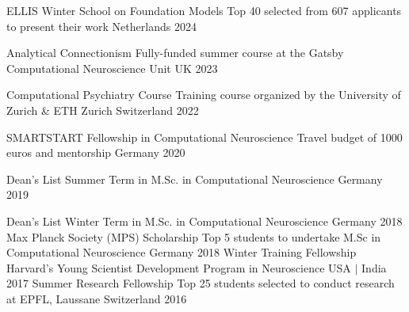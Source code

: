 



\begin{cvhonors}

    \cvhonor
    {ELLIS Winter School on Foundation Models} %
    {Top 40 selected from 607 applicants to present their work} %
    {Netherlands} %
    {2024} %
    
    \cvhonor
    {Analytical Connectionism} %
    {Fully-funded summer course at the Gatsby Computational Neuroscience Unit} %
    {UK} %
    {2023} %

    \cvhonor
    {Computational Psychiatry Course} %
    {Training course organized by the University of Zurich \& ETH Zurich} %
    {Switzerland} %
    {2022} %
    
    \cvhonor
    {SMARTSTART Fellowship in Computational Neuroscience} %
    {Travel budget of 1000 euros and mentorship} %
    {Germany} %
    {2020} %
    
  \cvhonor
    {Dean's List} %
    {Summer Term in M.Sc. in Computational Neuroscience} %
    {Germany} %
    {2019} %

  \cvhonor
    {Dean's List} %
    {Winter Term in M.Sc. in Computational Neuroscience} %
    {Germany} %
    {2018} %
    \cvhonor
    {Max Planck Society (MPS) Scholarship} %
    {Top 5 students to undertake M.Sc in Computational Neuroscience} %
    {Germany} %
    {2018} %
  \cvhonor
    {Winter Training Fellowship} %
    {Harvard's Young Scientist Development Program in Neuroscience} %
    {USA $\mid$ India} %
    {2017} %
  \cvhonor
    {Summer Research Fellowship} %
    {Top 25 students selected to conduct research at EPFL, Laussane} %
    {Switzerland} %
    {2016} %


\end{cvhonors}
